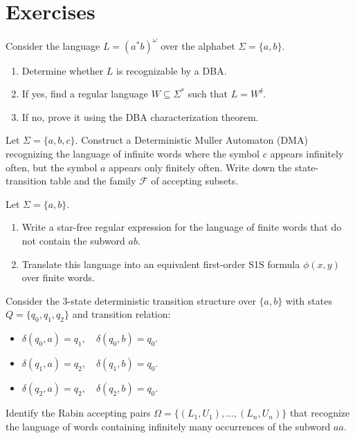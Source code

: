 \section{Exercises}
\label{sec:exercises}

\begin{chapex}
Consider the language $L = (a^*b)^\omega$ over the alphabet $\Sigma = \{a, b\}$.
\begin{enumerate}
    \item Determine whether $L$ is recognizable by a DBA.
    \item If yes, find a regular language $W \subseteq \Sigma^*$ such that $L = W^\delta$.
    \item If no, prove it using the DBA characterization theorem.
\end{enumerate}
\end{chapex}

\begin{chapex}
Let $\Sigma = \{a, b, c\}$. Construct a Deterministic Muller Automaton (DMA) recognizing the language of infinite words where the symbol $c$ appears infinitely often, but the symbol $a$ appears only finitely often. Write down the state-transition table and the family $\mathcal{F}$ of accepting subsets.
\end{chapex}

\begin{chapex}
Let $\Sigma = \{a, b\}$. 
\begin{enumerate}
    \item Write a star-free regular expression for the language of finite words that do not contain the subword $ab$.
    \item Translate this language into an equivalent first-order S1S formula $\phi(x, y)$ over finite words.
\end{enumerate}
\end{chapex}

\begin{chapex}
Consider the 3-state deterministic transition structure over $\{a,b\}$ with states $Q = \{q_0, q_1, q_2\}$ and transition relation:
\begin{itemize}
    \item $\delta(q_0, a) = q_1, \quad \delta(q_0, b) = q_0$.
    \item $\delta(q_1, a) = q_2, \quad \delta(q_1, b) = q_0$.
    \item $\delta(q_2, a) = q_2, \quad \delta(q_2, b) = q_0$.
\end{itemize}
Identify the Rabin accepting pairs $\Omega = \{ (L_1, U_1), \dots, (L_n, U_n) \}$ that recognize the language of words containing infinitely many occurrences of the subword $aa$.
\end{chapex}
